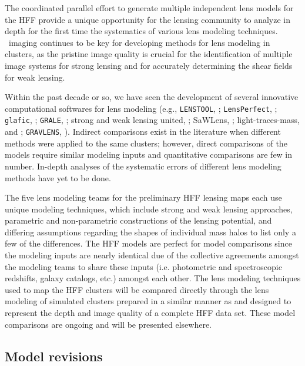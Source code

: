 The coordinated parallel effort to generate multiple independent lens models for the HFF provide a unique opportunity for the lensing community to analyze in depth for the first time the systematics of various lens modeling techniques. \hst\ imaging continues to be key for developing methods for lens modeling in clusters, as the pristine image quality is crucial for the identification of multiple image systems for strong lensing and for accurately determining the shear fields for weak lensing. 

Within the past decade or so, we have seen the development of several innovative computational softwares for lens modeling (e.g., \texttt{LENSTOOL}, \citet{Jullo:2007lr}; \texttt{LensPerfect}, \citet{Coe:2008mz}; \texttt{glafic}, \citet{Oguri:2010gr}; \texttt{GRALE}, \citet{Liesenborgs:2010gf}; strong and weak lensing united, \citet{Bradac:2005ve}; SaWLens, \citet{Merten:2009ul}; light-traces-mass, \citet{Broadhurst:2005qy} and \citet{Zitrin:2009qf}; \texttt{GRAVLENS}, \citet{Keeton:2001lr}). Indirect comparisons exist in the literature when different methods were applied to the same clusters; however, direct comparisons of the models require similar modeling inputs and quantitative comparisons are few in number. In-depth analyses of the systematic errors of different lens modeling methods have yet to be done.

The five lens modeling teams for the preliminary HFF lensing maps each use unique modeling techniques, which include strong and weak lensing approaches, parametric and non-parametric constructions of the lensing potential, and differing assumptions regarding the shapes of individual mass halos to list only a few of the differences. The HFF models are perfect for model comparisons since the modeling inputs are nearly identical due of the collective agreements amongst the modeling teams to share these inputs (i.e. photometric and spectroscopic redshifts, galaxy catalogs, etc.) amongst each other. The lens modeling techniques used to map the HFF clusters will be compared directly through the lens modeling of simulated clusters prepared in a similar manner as \citet{Meneghetti:2008oz} and designed to represent the depth and image quality of a complete HFF data set. These model comparisons are ongoing and will be presented elsewhere.

\subsection{Model revisions}

